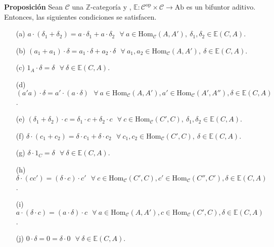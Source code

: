 \documentclass[preview]{standalone}
\begin{document}
\begin{center}
\flushleft \textbf{Proposición} Sean $\mathscr{C}$ una $\mathbb{Z}$-categoría y , $\mathbb{E}:\mathscr{C}^\text{op}\times\mathscr{C}\to\text{Ab}$ es un bifuntor aditivo. Entonces, las siguientes condiciones se satisfacen. \begin{enumerate} \item[(a)] $a\cdot(\delta_1+\delta_2) = a\cdot\delta_1 + a\cdot\delta_2 \ \ \ \forall \ a\in\text{Hom}_\mathscr{C}(A,A'), \ \delta_1,\delta_2\in\mathbb{E}(C,A)$. \item[(b)] $(a_1+a_1)\cdot\delta = a_1\cdot\delta + a_2\cdot\delta \ \ \ \forall \ a_1,a_2\in\text{Hom}_\mathscr{C}(A,A'), \ \delta\in\mathbb{E}(C,A)$. \item[(c)] $1_A\cdot\delta = \delta \ \ \ \forall \ \delta\in\mathbb{E}(C,A)$. \item[(d)] $(a'a)\cdot\delta = a'\cdot(a\cdot\delta) \ \ \ \forall \ a\in\text{Hom}_\mathscr{C}(A,A'), a'\in\text{Hom}_\mathscr{C}(A',A''), \delta\in\mathbb{E}(C,A)$. \item[(e)] $(\delta_1+\delta_2)\cdot c = \delta_1\cdot c + \delta_2\cdot c \ \ \ \forall \ c\in\text{Hom}_\mathscr{C}(C',C), \ \delta_1,\delta_2\in\mathbb{E}(C,A)$. \item[(f)] $\delta\cdot(c_1+c_2)=\delta\cdot c_1 + \delta\cdot c_2 \ \ \ \forall \ c_1,c_2\in\text{Hom}_\mathscr{C}(C',C), \ \delta\in\mathbb{E}(C,A)$. \item[(g)] $\delta\cdot1_C  = \delta \ \ \ \forall \ \delta\in\mathbb{E}(C,A)$. \item[(h)] $\delta\cdot(cc') = (\delta\cdot c)\cdot c' \ \ \ \forall \ c\in\text{Hom}_\mathscr{C}(C',C), c'\in\text{Hom}_\mathscr{C}(C'',C'), \delta\in\mathbb{E}(C,A)$. \item[(i)] $a\cdot(\delta\cdot c) = (a\cdot\delta)\cdot c \ \ \ \forall \ a\in\text{Hom}_\mathscr{C}(A,A'), c\in\text{Hom}_\mathscr{C}(C',C), \delta\in\mathbb{E}(C,A)$. \item[(j)] $0\cdot\delta = 0 = \delta\cdot0 \ \ \ \forall \ \delta\in\mathbb{E}(C,A)$. \end{enumerate}
\end{center}
\end{document}
